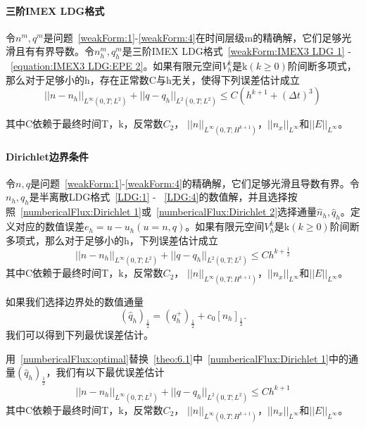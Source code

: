 \paragraph{三阶IMEX LDG格式}
\begin{theorem}
    令$n^m,q^m$是问题~\eqref{weakForm:1}-\eqref{weakForm:4}在时间层级m的精确解，它们足够光滑且有有界导数。令$n_h^m,q_h^m$是三阶IMEX LDG格式~\eqref{weakForm:IMEX3 LDG 1} - ~\eqref{equation:IMEX3 LDG:EPE 2}。如果有限元空间$V_h^k$是k$(k\geq  0)$阶间断多项式，那么对于足够小的h，存在正常数C与h无关，使得下列误差估计成立
    \begin{equation}
        ||n-n_h||_{L^{\infty}(0,T;L^2)} + ||q - q_h||_{L^2(0,T;L^2)} \leq C(h^{k+1} + (\Delta t)^3)
    \end{equation}
\end{theorem}
其中C依赖于最终时间T，k，反常数$C_2$， $||n||_{L^{\infty}(0,T;H^{k+1})}$，$||n_x||_{L^{\infty}}$和$||E||_{L^{\infty}}$。

\paragraph{Dirichlet边界条件}
\begin{lemma}\label{theo:6.1}
    令$n,q$是问题~\eqref{weakForm:1}-\eqref{weakForm:4}的精确解，它们足够光滑且导数有界。令$n_h,q_h$是半离散LDG格式~\eqref{LDG:1} - ~\eqref{LDG:4}的数值解，并且选择按照~\eqref{numbericalFlux:Dirichlet 1}或~\eqref{numbericalFlux:Dirichlet 2}选择通量$\hat{n}_h,\hat{q}_h$。定义对应的数值误差$e_h = u-u_h(u = n,q)$。如果有限元空间$V_h^k$是k$(k\geq  0)$阶间断多项式，那么对于足够小的h，下列误差估计成立
    \begin{equation}
        ||n-n_h||_{L^{\infty}(0,T;L^2)} + ||q - q_h||_{L^2(0,T;L^2)} \leq Ch^{k+\frac{1}{2}}
    \end{equation}
    其中C依赖于最终时间T，k，反常数$C_2$， $||n||_{L^{\infty}(0,T;H^{k+1})}$，$||n_x||_{L^{\infty}}$和$||E||_{L^{\infty}}$。
\end{lemma}
如果我们选择边界处的数值通量
\begin{equation}
    (\hat{q}_h)_{\frac{1}{2}} = (q_h^+)_{\frac{1}{2}} + c_0[n_h]_{\frac{1}{2}}. \label{numbericalFlux:optimal}
\end{equation}
我们可以得到下列最优误差估计。
\begin{theorem}
    用~\eqref{numbericalFlux:optimal}替换~\cref{theo:6.1}中~\eqref{numbericalFlux:Dirichlet 1}中的通量$(\hat{q}_h)_{\frac{1}{2}}$，我们有以下最优误差估计
    \begin{equation}
        ||n-n_h||_{L^{\infty}(0,T;L^2)} + ||q - q_h||_{L^2(0,T;L^2)} \leq C h^{k+1}
    \end{equation}
    其中C依赖于最终时间T，k，反常数$C_2$， $||n||_{L^{\infty}(0,T;H^{k+1})}$，$||n_x||_{L^{\infty}}$和$||E||_{L^{\infty}}$。
\end{theorem}
